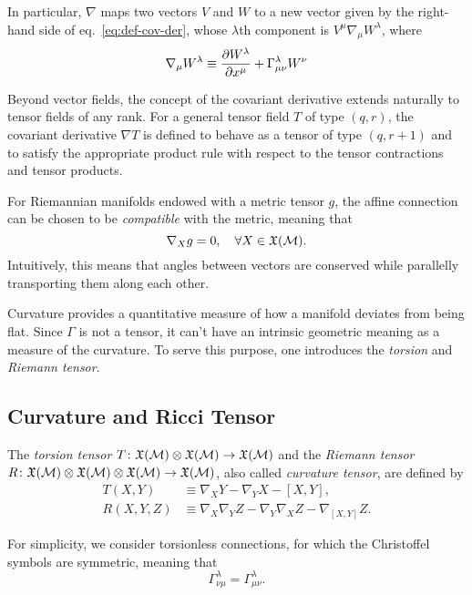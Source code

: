 In particular, $\nabla$ maps two vectors $V$ and $W$ to a new vector given by the right-hand side of eq.~\eqref{eq:def-cov-der}, whose $\lambda$th component is $V^\mu \nabla_\mu W^\lambda$, where
\begin{equation}
    \nabla_\mu W^\lambda \equiv \frac{\partial W^\lambda}{\partial x^\mu} + \Gamma^\lambda_{\mu\nu} W^\nu
\end{equation}

Beyond vector fields, the concept of the covariant derivative extends naturally to tensor fields of any rank. For a general tensor field $T$ of type $(q, r)$, the covariant derivative $\nabla T$ is defined to behave as a tensor of type $(q, r+1)$ and to satisfy the appropriate product rule with respect to the tensor contractions and tensor products.

For Riemannian manifolds endowed with a metric tensor $g$, the affine connection can be chosen to be \emph{compatible} with the metric, meaning that
\begin{equation}
    \nabla_X g = 0, \quad \forall X \in \mathfrak{X}(\mathcal{M}).
\end{equation}
Intuitively, this means that angles between vectors are conserved while parallelly transporting them along each other.

Curvature provides a quantitative measure of how a manifold deviates from being flat. Since $\Gamma$ is not a tensor, it can't have an intrinsic geometric meaning as a measure of the curvature. To serve this purpose, one introduces the \emph{torsion} and \emph{Riemann tensor}.

\subsection{Curvature and Ricci Tensor}

The \emph{torsion tensor} $T \colon \mathfrak{X}(\mathcal{M}) \otimes \mathfrak{X}(\mathcal{M}) \to \mathfrak{X}(\mathcal{M}) $ and the \emph{Riemann tensor} $R \colon \mathfrak{X}(\mathcal{M}) \otimes \mathfrak{X}(\mathcal{M}) \otimes \mathfrak{X}(\mathcal{M}) \to \mathfrak{X}(\mathcal{M}) $, also called \emph{curvature tensor}, are defined by
\begin{align}
    T(X, Y) &\equiv \nabla_X Y - \nabla_Y X - [X,Y], \\
    R(X,Y,Z) &\equiv \nabla_X \nabla_Y Z - \nabla_Y \nabla_X Z - \nabla_{[X,Y]} Z \label{eq:def-riemann}.
\end{align}

For simplicity, we consider torsionless connections, for which the Christoffel symbols are symmetric, meaning that
\begin{equation}
    \Gamma^\lambda_{\nu\mu} = \Gamma^\lambda_{\mu\nu} .
\end{equation}

